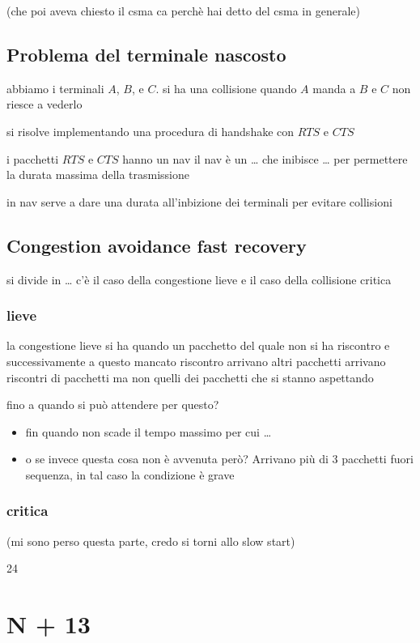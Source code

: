 \documentclass[11pt]{article}
\begin{document}
(che poi aveva chiesto il csma ca perchè hai detto del csma in generale)

\subsection{Problema del terminale nascosto}
\label{sec:org5ce1429}
abbiamo i terminali \(A\), \(B\), e \(C\).
si ha una collisione quando \(A\) manda a \(B\) e \(C\) non riesce a vederlo

si risolve implementando una procedura di handshake con \(RTS\) e \(CTS\)

i pacchetti \(RTS\) e \(CTS\) hanno un nav
il nav è un \ldots{} che inibisce \ldots{} per permettere la durata massima della trasmissione

in nav serve a dare una durata all'inbizione dei terminali per evitare collisioni

\subsection{Congestion avoidance fast recovery}
\label{sec:orgfcd52bb}
si divide in \ldots{}
c'è il caso della congestione lieve e il caso della collisione critica

\subsubsection{lieve}
\label{sec:org55997ae}
la congestione lieve si ha quando un pacchetto del quale non si ha riscontro e successivamente a questo mancato riscontro arrivano altri pacchetti
arrivano riscontri di pacchetti ma non quelli dei pacchetti che si stanno aspettando

fino a quando si può attendere per questo?
\begin{itemize}
\item fin quando non scade il tempo massimo per cui \ldots{}
\item o se invece questa cosa non è avvenuta però? Arrivano più di 3 pacchetti fuori sequenza, in tal caso la condizione è grave
\end{itemize}

\subsubsection{critica}
\label{sec:org5356195}
(mi sono perso questa parte, credo si torni allo slow start)

24

\section{N + 13}
\label{sec:orgd0494bd}
\end{document}
